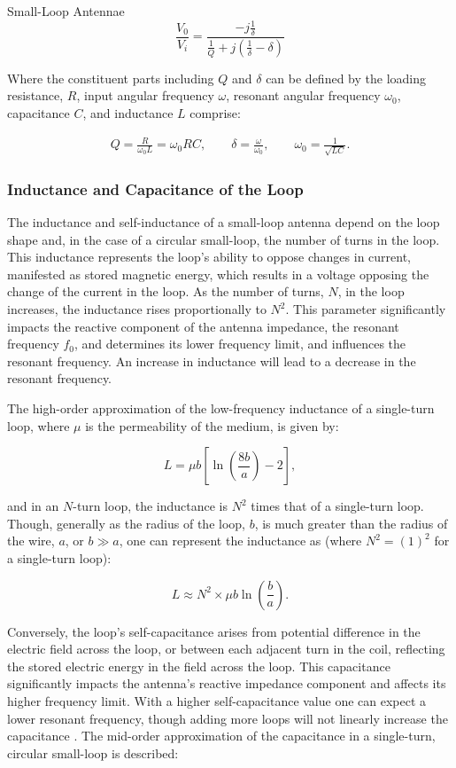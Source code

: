 \documentclass[12pt]{article}
\begin{document}
\begin{section} {Small-Loop Antennae}
\[
\frac{V_0}{V_i} = \frac{-j \frac{1}{\delta}}{\frac{1}{Q} + j \left( \frac{1}{\delta} - \delta \right)}
\]

Where the constituent parts including $Q$ and $\delta$ can be defined by the loading resistance, $R$, input angular frequency $\omega$, resonant angular frequency $\omega_0$, capacitance $C$, and inductance $L$ comprise:

\begin{align*}
Q = \frac{R}{\omega_0 L} = \omega_0 R C,
\qquad
\delta = \frac{\omega}{\omega_0},
\qquad
\omega_0 = \frac{1}{\sqrt{LC}}.
\end{align*}

\subsubsection{Inductance and Capacitance of the Loop}

The inductance and self-inductance of a small-loop antenna depend on the loop shape and, in the case of a circular small-loop, the number of turns in the loop.  This inductance represents the loop's ability to oppose changes in current, manifested as stored magnetic energy, which results in a voltage opposing the change of the current in the loop. As the number of turns, $ N $, in the loop increases, the inductance rises proportionally to $ N^2 $. This parameter significantly impacts the reactive component of the antenna impedance, the resonant frequency $ f_0 $, and determines its lower frequency limit, and influences the resonant frequency. An increase in inductance will lead to a decrease in the resonant frequency.

The high-order approximation of the low-frequency inductance of a single-turn loop, where $\mu$ is the permeability of the medium, is given by:

\[
L = \mu b \left[ \ln\left(\frac{8b}{a}\right) - 2 \right],
\]

and in an $N$-turn loop, the inductance is $N^2$ times that of a single-turn loop. Though, generally as the radius of the loop, $b$, is much greater than the radius of the wire, $a$, or $ b \gg a $, one can represent the inductance as (where $ N^2=(1)^2 $ for a single-turn loop):

\[
L \approx N^2 \times \mu b \ln \left( \frac{b}{a} \right).
\]

Conversely, the loop's self-capacitance arises from potential difference in the electric field across the loop, or between each adjacent turn in the coil, reflecting the stored electric energy in the field across the loop. This capacitance significantly impacts the antenna's reactive impedance component and affects its higher frequency limit. With a higher self-capacitance value one can expect a lower resonant frequency, though adding more loops will not linearly increase the capacitance \cite{whiteside_loop_1964}. The mid-order approximation of the capacitance in a single-turn, circular small-loop is described:


\end{section}
\end{document}
